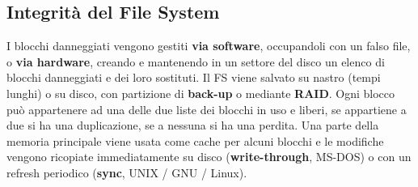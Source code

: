 \documentclass{article}
\begin{document}
\subsection{Integrità del File System} I blocchi danneggiati vengono gestiti \textbf{via software}, occupandoli con un falso file, o \textbf{via hardware}, creando e mantenendo in un settore del disco un elenco di blocchi danneggiati e dei loro sostituti. Il FS viene salvato su nastro (tempi lunghi) o su disco, con partizione di \textbf{back-up} o mediante \textbf{RAID}. Ogni blocco può appartenere ad una delle due liste dei blocchi in uso e liberi, se appartiene a due si ha una duplicazione, se a nessuna si ha una perdita. Una parte della memoria principale viene usata come cache per alcuni blocchi e le modifiche vengono ricopiate immediatamente su disco (\textbf{write-through}, MS-DOS) o con un refresh periodico (\textbf{sync}, UNIX / GNU / Linux).
\end{document}
